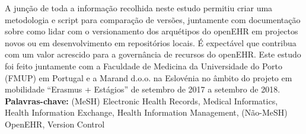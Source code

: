\documentclass[mim_thesis.tex]{subfiles}
\begin{document}
A junção de toda a informação recolhida neste estudo permitiu criar uma metodologia e script para comparação de versões, juntamente com documentação sobre como lidar com o versionamento dos arquétipos do openEHR em projectos novos ou em desenvolvimento em repositórios locais. É expectável que contribua com um valor acrescido para a governância de recursos do openEHR.
Este estudo foi feito juntamente com a Faculdade de Medicina da Universidade do Porto (FMUP) em Portugal e a Marand d.o.o. na Eslovénia no âmbito do projeto em mobilidade “Erasmus + Estágios” de setembro de 2017 a setembro de 2018.\\ 

\textbf{Palavras-chave:} (MeSH) Electronic Health Records, Medical Informatics, Health Information Exchange, Health Information Management, (Não-MeSH) OpenEHR, Version Control
\end{document}

